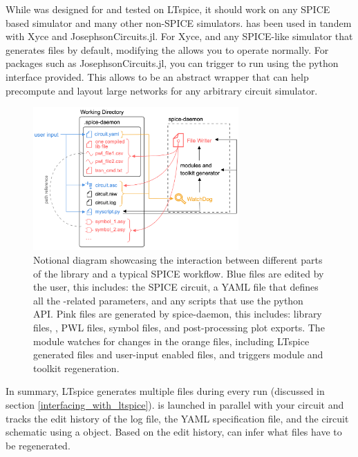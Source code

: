 While  was designed for and tested on LTspice, it should work on any
SPICE based simulator and many other non-SPICE simulators.  has been
used in tandem with Xyce and JosephsonCircuits.jl. For Xyce, and any SPICE-like
simulator that generates files by default, modifying the  allows you
to operate  normally. For packages such as JosephsonCircuits.jl, you can
trigger  to run using the python interface provided. This allows
 to be an abstract wrapper that can help precompute and layout large
networks for any arbitrary circuit simulator.

\begin{figure}
    \centering
    \includegraphics[width=0.7\textwidth]{figs/spice-daemon-interaction.png}
    \caption{Notional diagram showcasing the interaction between different parts of the 
    library and a typical SPICE workflow. Blue files are edited by the user, this includes: the
    SPICE circuit, a YAML file that defines all the -related parameters, and 
    any scripts that use the  python API. Pink files are generated by spice-daemon,
    this includes: library files, , PWL files, symbol files, and post-processing plot exports. The  module watches for changes in the orange files, including LTspice generated files and user-input enabled files, and triggers module and toolkit regeneration.}
    \label{fig:spice-daemon-interaction}
\end{figure}

In summary, LTspice generates multiple files during every run (discussed in section \ref{interfacing_with_ltspice}).  is launched in parallel with your circuit
and tracks the edit history of the log file,
the YAML specification file, and the 
circuit schematic using a  object. Based on the edit history, 
can infer what files have to be regenerated.

